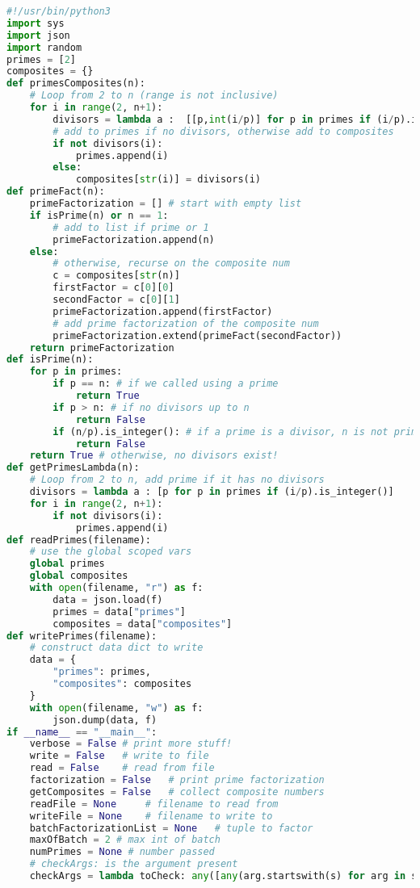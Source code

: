 \documentclass[12pt]{article}
\begin{document}
\begin{lstlisting}[language=Python]
#!/usr/bin/python3
import sys
import json
import random
primes = [2]
composites = {}
def primesComposites(n):
    # Loop from 2 to n (range is not inclusive)
    for i in range(2, n+1):
        divisors = lambda a :  [[p,int(i/p)] for p in primes if (i/p).is_integer()]
        # add to primes if no divisors, otherwise add to composites
        if not divisors(i):
            primes.append(i)
        else:
            composites[str(i)] = divisors(i)
def primeFact(n):
    primeFactorization = [] # start with empty list
    if isPrime(n) or n == 1:
        # add to list if prime or 1
        primeFactorization.append(n)
    else:
        # otherwise, recurse on the composite num
        c = composites[str(n)]
        firstFactor = c[0][0]
        secondFactor = c[0][1]
        primeFactorization.append(firstFactor)
        # add prime factorization of the composite num
        primeFactorization.extend(primeFact(secondFactor))
    return primeFactorization
def isPrime(n):
    for p in primes:
        if p == n: # if we called using a prime
            return True
        if p > n: # if no divisors up to n
            return False
        if (n/p).is_integer(): # if a prime is a divisor, n is not prime
            return False
    return True # otherwise, no divisors exist!
def getPrimesLambda(n):
    # Loop from 2 to n, add prime if it has no divisors
    divisors = lambda a : [p for p in primes if (i/p).is_integer()]
    for i in range(2, n+1):
        if not divisors(i):
            primes.append(i)
def readPrimes(filename):
    # use the global scoped vars
    global primes
    global composites
    with open(filename, "r") as f:
        data = json.load(f)
        primes = data["primes"]
        composites = data["composites"]
def writePrimes(filename):
    # construct data dict to write
    data = {
        "primes": primes,
        "composites": composites
    }
    with open(filename, "w") as f:
        json.dump(data, f)
if __name__ == "__main__":
    verbose = False # print more stuff!
    write = False   # write to file
    read = False    # read from file
    factorization = False   # print prime factorization
    getComposites = False   # collect composite numbers
    readFile = None     # filename to read from
    writeFile = None    # filename to write to
    batchFactorizationList = None   # tuple to factor
    maxOfBatch = 2 # max int of batch
    numPrimes = None # number passed
    # checkArgs: is the argument present
    checkArgs = lambda toCheck: any([any(arg.startswith(s) for arg in sys.argv) for s in toCheck])

\end{lstlisting}
\end{document}
